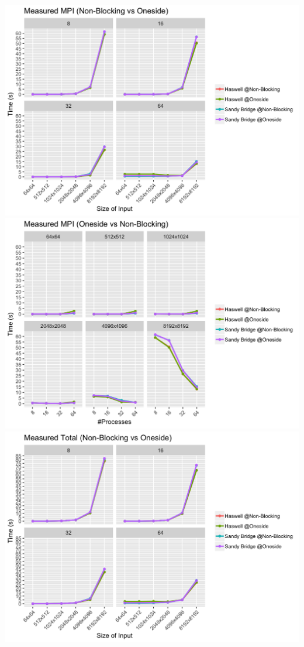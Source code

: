 \documentclass[10pt, letterpaper, twoside]{article}
\begin{document}
\begin{titlepage}
\begin{enumerate}
\includegraphics[scale = 0.18]{OSP2P_Measured-MPI_Processes.png}
\includegraphics[scale = 0.18]{OSP2P_Measured-MPI_InputSize.png}
\vspace{1mm}
\includegraphics[scale = 0.18]{OSP2P_Measured-Total_Processes.png}

\end{enumerate}
\end{titlepage}
\end{document}
